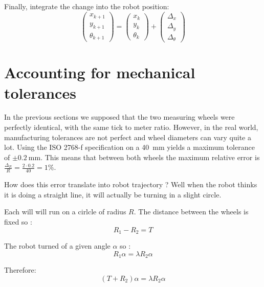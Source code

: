 \documentclass[a4paper]{IEEEtran}
\begin{document}
Finally, integrate the change into the robot position:
\begin{equation}
    \begin{pmatrix}
        x_{k+1}\\
        y_{k+1}\\
        \theta_{k+1}
    \end{pmatrix}
    =
    \begin{pmatrix}
        x_{k}\\
        y_{k}\\
        \theta_{k}
    \end{pmatrix}
    +
    \begin{pmatrix}
        \Delta_x\\\Delta_y\\\Delta_\theta
    \end{pmatrix}
\end{equation}


\section{Accounting for mechanical tolerances}
In the previous sections we supposed that the two measuring wheels were perfectly identical, with the same tick to meter ratio.
However, in the real world, manufacturing tolerances are not perfect and wheel diameters can vary quite a lot.
Using the ISO 2768-f specification on a \SI{40}{\milli\meter} yields a maximum tolerance of $\pm \SI{0.2}{\milli\meter}$.
This means that between both wheels the maximum relative error is $\frac{\Delta_R}{R} = \frac{2 \cdot 0.2}{40} = 1\% $.

How does this error translate into robot trajectory ?
Well when the robot thinks it is doing a straight line, it will actually be turning in a slight circle.

Each will will run on a cirlcle of radius $R$.
The distance between the wheels is fixed so :
\begin{equation*}
    R_1 - R_2 = T
\end{equation*}

The robot turned of a given angle $\alpha$ so :
\begin{equation*}
    R_1 \alpha = \lambda R_2 \alpha
\end{equation*}

Therefore:
\begin{equation*}
    (T + R_2) \alpha = \lambda R_2 \alpha
\end{equation*}
\end{document}
